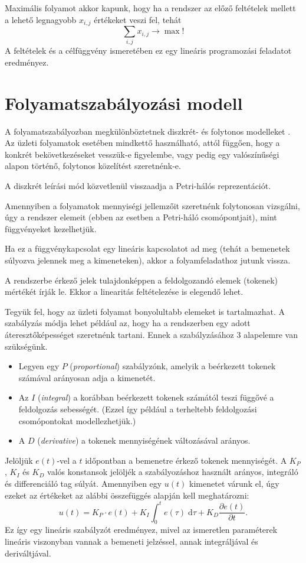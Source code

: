 \documentclass[a4paper]{article}
\begin{document}
Maximális folyamot akkor kapunk, hogy ha a rendszer az előző feltételek mellett a lehető legnagyobb $x_{i, j}$ értékeket veszi fel, tehát
\[
\displaystyle \sum_{i, j} x_{i, j} \rightarrow \max!
\]
A feltételek és a célfüggvény ismeretében ez egy lineáris programozási feladatot eredményez.

\section{Folyamatszabályozási modell}

A folyamatszabályozban megkülönböztetnek diszkrét- és folytonos modelleket \cite{bikfalvi}.
Az üzleti folyamatok esetében mindkettő használható, attól függően, hogy a konkrét bekövetkezéseket vesszük-e figyelembe, vagy pedig egy valószínűségi alapon történő, folytonos közelítést szeretnénk-e.

A diszkrét leírási mód közvetlenül visszaadja a Petri-hálós reprezentációt.

Amennyiben a folyamatok mennyiségi jellemzőit szeretnénk folytonosan vizsgálni, úgy a rendszer elemeit (ebben az esetben a Petri-háló csomópontjait), mint függvényeket kezelhetjük.

Ha ez a függvénykapcsolat egy lineáris kapcsolatot ad meg (tehát a bemenetek súlyozva jelennek meg a kimeneteken), akkor a folyamfeladathoz jutunk vissza.

A rendszerbe érkező jelek tulajdonképpen a feldolgozandó elemek (tokenek) mértékét írják le.
Ekkor a linearitás feltételezése is elegendő lehet.

Tegyük fel, hogy az üzleti folyamat bonyolultabb elemeket is tartalmazhat.
A szabályzás módja lehet például az, hogy ha a rendszerben egy adott áteresztőképességet szeretnénk tartani.
Ennek a szabályzásához 3 alapelemre van szükségünk.
\begin{itemize}
\item Legyen egy $P$ (\textit{proportional}) szabályzónk, amelyik a beérkezett tokenek számával arányosan adja a kimenetét.
\item Az $I$ (\textit{integral}) a korábban beérkezett tokenek számától teszi függővé a feldolgozás sebességét. (Ezzel így például a terheltebb feldolgozási csomópontokat modellezhetjük.)
\item A $D$ (\textit{derivative}) a tokenek mennyiségének változásával arányos.
\end{itemize}
Jelöljük $e(t)$-vel a $t$ időpontban a bemenetre érkező tokenek mennyiségét.
A $K_P$, $K_I$ és $K_D$ valós konstansok jelöljék a szabályozáshoz használt arányos, integráló és differenciáló tag súlyát.
Amennyiben egy $u(t)$ kimenetet várunk el, úgy ezeket az értékeket az alábbi összefüggés alapján kell meghatározni:
\[
u(t) =
K_P \cdot e(t) +
K_I \displaystyle \int_{0}^{t} \! e(\tau) \; \textrm{d}\tau +
K_D \dfrac{\partial e(t)}{\partial t}.
\]
Ez így egy lineáris szabályzót eredményez, mivel az ismeretlen paraméterek lineáris viszonyban vannak a bemeneti jelzéssel, annak integráljával és deriváltjával.
\end{document}
